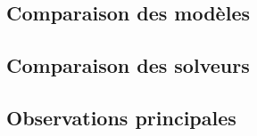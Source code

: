\subsection{Comparaison des modèles}


\subsection{Comparaison des solveurs}


\subsection{Observations principales}


